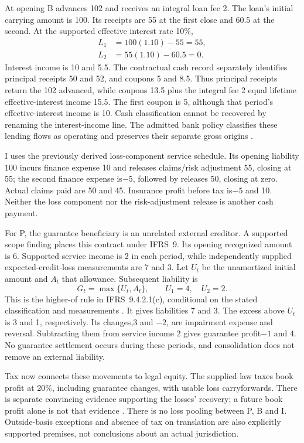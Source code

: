 At opening B advances 102 and receives an integral loan fee 2. The loan's initial
carrying amount is 100. Its receipts are 55 at the first close and 60.5 at the
second. At the supported effective interest rate 10\%,
\begin{align}
 L_1&=100(1.10)-55=55,\\
 L_2&=55(1.10)-60.5=0.
\end{align}
Interest income is 10 and 5.5. The contractual cash record separately identifies
principal receipts 50 and 52, and coupons 5 and 8.5. Thus principal receipts return
the 102 advanced, while coupons 13.5 plus the integral fee 2 equal lifetime
effective-interest income 15.5. The first coupon is 5, although that period's
effective-interest income is 10. Cash classification cannot be recovered by
renaming the interest-income line. The admitted bank policy classifies these
lending flows as operating and preserves their separate gross origins
\citep[IAS~7.14--15,31--33; IFRS~9.B 5.4.1--B 5.4.4]{eu20231803}.

I uses the previously derived loss-component service schedule. Its opening
liability 100 incurs finance expense 10 and releases claims/risk adjustment 55,
closing at 55; the second finance expense is\(-5\), followed by releases 50,
closing at zero. Actual claims paid are 50 and 45. Insurance profit before tax
is\(-5\) and 10. Neither the loss component nor the risk-adjustment release is
another cash payment.

For P, the guarantee beneficiary is an unrelated external creditor. A supported
scope finding places this contract under IFRS~9. Its opening recognized amount
is 6. Supported service income is 2 in each period, while independently supplied
expected-credit-loss measurements are 7 and 3. Let \(U_t\) be the unamortized
initial amount and \(A_t\) that allowance. Subsequent liability is
\begin{equation}
 G_t=\max\{U_t,A_t\},\qquad U_1=4,\quad U_2=2.
 \label{eq:sector-guarantee-higher-of}
\end{equation}
This is the higher-of rule in IFRS~9.4.2.1(c), conditional on the stated
classification and measurements \citep{eu20231803}. It gives liabilities 7
and 3. The excess above \(U_t\) is 3 and 1, respectively. Its changes,3 and
\(-2\), are impairment expense and reversal. Subtracting them from service
income 2 gives guarantee profit\(-1\) and 4. No guarantee settlement occurs
during these periods, and consolidation does not remove an external liability.

Tax now connects these movements to legal equity. The supplied law taxes book
profit at 20\%, including guarantee changes, with usable loss carryforwards.
There is separate convincing evidence supporting the losses' recovery; a
future book profit alone is not that evidence
\citep[IAS~12.34--36,46--47]{eu20231803}. There is no loss pooling between P,
B and I. Outside-basis exceptions and absence of tax on translation are also
explicitly supported premises, not conclusions about an actual jurisdiction.


